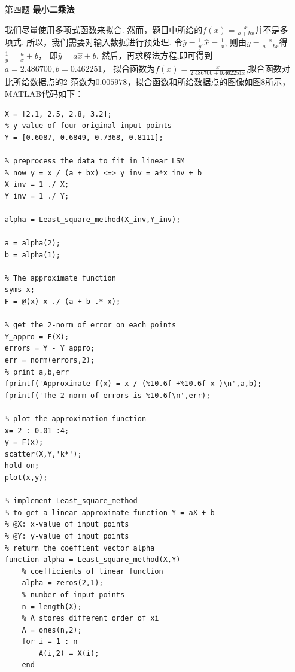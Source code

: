 \documentclass[12pt,a4paper,utf8]{ctexart}
\begin{document}
\begin{enumerate}
\begin{itemize}
\begin{lstlisting}[frame=single]
    % get the testing points
    test_x = linspace(0,1,k);
    % the actual function value of testing points
    f = F(test_x);
    % the evaluated function value of testing points
    L = zeros(1,k);
    
    % get the error of each testing point
    for i = 1 : k
        tmp = 0;
        % sum on each interpolation point
        for j = 1 : n
            tmp = tmp + l(test_x(i), j, n) * f(i);
        end
        L(i) = tmp;
    end
    % get the errors on each testing point and plot them
    error = abs(L-f);
    semilogy(test_x,error);
    grid on;
end
    \end{lstlisting}

    \end{itemize}

\item[第四题] \textbf{最小二乘法}
  \begin{itemize}
  \par
  我们尽量使用多项式函数来拟合.
  然而，题目中所给的$f(x) = \frac{x}{a+bx}$并不是多项式.
  所以，我们需要对输入数据进行预处理.
  令$\hat{y} = \frac{1}{y}$,$\hat{x} = \frac{1}{x}$,
  则由$y = \frac{x}{a+bx}$得$\frac{1}{y} = \frac{a}{x} + b$，
  即$\hat{y} = a\hat{x} + b$.
  然后，再求解法方程,即可得到$a = 2.486700,b = 0.462251$，
  拟合函数为$f(x) = \frac{x}{2.486700 + 0.462251x}$,拟合函数对比所给数据点的2-范数为$0.005978$，拟合函数和所给数据点的图像如图8所示，MATLAB代码如下：
  \begin{lstlisting}[frame=single]
% x-value of four original input points 
X = [2.1, 2.5, 2.8, 3.2];
% y-value of four original input points
Y = [0.6087, 0.6849, 0.7368, 0.8111];

% preprocess the data to fit in linear LSM
% now y = x / (a + bx) <=> y_inv = a*x_inv + b
X_inv = 1 ./ X;
Y_inv = 1 ./ Y;

alpha = Least_square_method(X_inv,Y_inv);

a = alpha(2);
b = alpha(1);

% The approximate function
syms x;
F = @(x) x ./ (a + b .* x);

% get the 2-norm of error on each points
Y_appro = F(X);
errors = Y - Y_appro;
err = norm(errors,2);
% print a,b,err 
fprintf('Approximate f(x) = x / (%10.6f +%10.6f x )\n',a,b);
fprintf('The 2-norm of errors is %10.6f\n',err);

% plot the approximation function
x= 2 : 0.01 :4;
y = F(x);
scatter(X,Y,'k*');
hold on;
plot(x,y);

% implement Least_square_method
% to get a linear approximate function Y = aX + b
% @X: x-value of input points 
% @Y: y-value of input points
% return the coeffient vector alpha
function alpha = Least_square_method(X,Y)
    % coefficients of linear function
    alpha = zeros(2,1);
    % number of input points
    n = length(X);
    % A stores different order of xi
    A = ones(n,2);
    for i = 1 : n
        A(i,2) = X(i);
    end
    

\end{lstlisting}
\end{itemize}
\end{enumerate}
\end{document}
